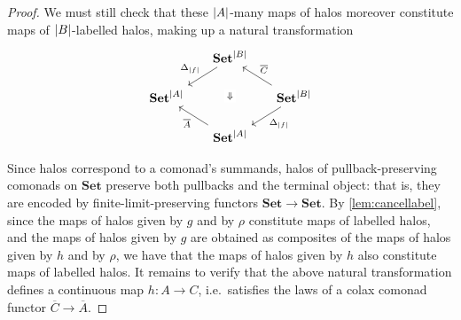 \documentclass[11pt, oneside, article]{memoir}
\theoremstyle{plain}
\theoremstyle{definition}
\theoremstyle{remark}
\DeclareMathOperator{\ophelper}{op}
\DeclarePairedDelimiter{\abs}{\lvert}{\rvert}
\newcommand{\op}{^{\ophelper}}
\newcommand{\namedcat}[1]{\mathbf{#1}}
\newcommand{\Set}{\namedcat{Set}}
\newcommand{\Fam}{\mathbf{Fam}}
\newcommand{\clift}[1]{\overline{#1}}
\newcommand{\pts}[1]{{\abs{#1}}}
\newcommand{\one}[1]{\pts{#1}}
\newcommand{\reindex}[1]{\Delta_{#1}}
\newcommand{\fun}[2]{{#2}^{#1}}
\newcommand{\cmnd}[1]{{#1}}
\newcommand{\cA}{\cmnd{A}}
\newcommand{\cB}{\cmnd{B}}
\newcommand{\cC}{\cmnd{C}}
\newcommand{\SetpA}{\Set^\pts{\cA}}
\newcommand{\SetpB}{\Set^\pts{\cB}}
\begin{document}
\begin{proof}
  We must still check
  that these $\pts{A}$-many maps of halos moreover constitute maps of
  $\pts{\cB}$-labelled halos,
  making up a natural transformation
  \[\begin{tikzcd}[column sep=15,row sep=15]
      & \SetpB & \\
      \SetpA && \SetpB \\
      & \SetpA
      \arrow["{\reindex{\one{f}}}"', from=1-2, to=2-1]
      \arrow["\Downarrow"{description}, draw=none, from=1-2, to=3-2]
      \arrow["{\clift{\cC}}"', from=2-3, to=1-2]
      \arrow["{\reindex{\one{f}}}", from=2-3, to=3-2]
      \arrow["{\clift{\cA}}", from=3-2, to=2-1]
    \end{tikzcd}
  \]

  Since halos correspond to a comonad's summands, halos of
  pullback-preserving comonads on $\Set$ preserve both pullbacks and
  the terminal object: that is, they are encoded by
  finite-limit-preserving functors $\Set \to \Set$.  By
  \cref{lem:cancellabel}, since the maps of halos given by $g$ and by
  $\rho$ constitute maps of labelled halos, and the maps of halos
  given by $g$ are obtained as composites of the maps of halos given
  by $h$ and by $\rho$, we have that the maps of halos given by $h$
  also constitute maps of labelled halos. It remains to verify that
  the above natural transformation defines a continuous map
  $h \colon \cA \to \cC$, i.e.\ satisfies the laws of a colax comonad
  functor $\clift{\cC} \to \clift{\cA}$.


\end{proof}
\end{document}
